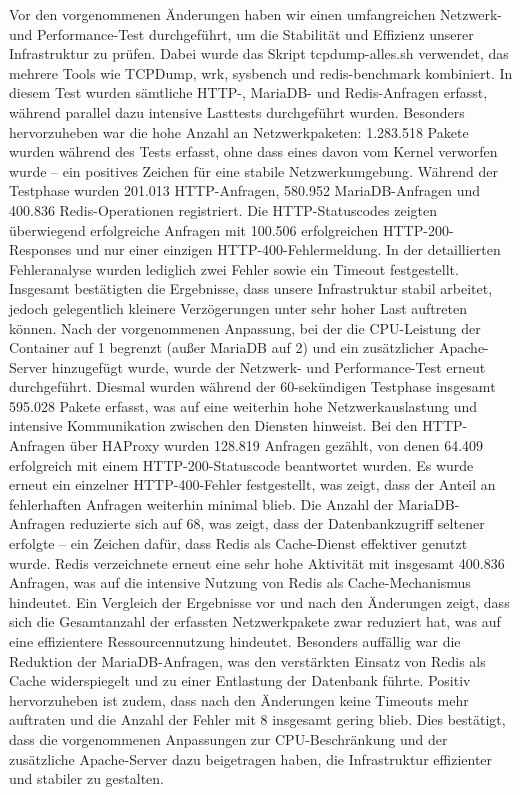 Vor den vorgenommenen Änderungen haben wir einen umfangreichen Netzwerk- und Performance-Test durchgeführt, um die Stabilität und Effizienz unserer Infrastruktur zu prüfen. Dabei wurde das Skript tcpdump-alles.sh verwendet, das mehrere Tools wie TCPDump, wrk, sysbench und redis-benchmark kombiniert. In diesem Test wurden sämtliche HTTP-, MariaDB- und Redis-Anfragen erfasst, während parallel dazu intensive Lasttests durchgeführt wurden. Besonders hervorzuheben war die hohe Anzahl an Netzwerkpaketen: 1.283.518 Pakete wurden während des Tests erfasst, ohne dass eines davon vom Kernel verworfen wurde – ein positives Zeichen für eine stabile Netzwerkumgebung. Während der Testphase wurden 201.013 HTTP-Anfragen, 580.952 MariaDB-Anfragen und 400.836 Redis-Operationen registriert. Die HTTP-Statuscodes zeigten überwiegend erfolgreiche Anfragen mit 100.506 erfolgreichen HTTP-200-Responses und nur einer einzigen HTTP-400-Fehlermeldung. In der detaillierten Fehleranalyse wurden lediglich zwei Fehler sowie ein Timeout festgestellt. Insgesamt bestätigten die Ergebnisse, dass unsere Infrastruktur stabil arbeitet, jedoch gelegentlich kleinere Verzögerungen unter sehr hoher Last auftreten können.
Nach der vorgenommenen Anpassung, bei der die CPU-Leistung der Container auf 1 begrenzt (außer MariaDB auf 2) und ein zusätzlicher Apache-Server hinzugefügt wurde, wurde der Netzwerk- und Performance-Test erneut durchgeführt. Diesmal wurden während der 60-sekündigen Testphase insgesamt 595.028 Pakete erfasst, was auf eine weiterhin hohe Netzwerkauslastung und intensive Kommunikation zwischen den Diensten hinweist. Bei den HTTP-Anfragen über HAProxy wurden 128.819 Anfragen gezählt, von denen 64.409 erfolgreich mit einem HTTP-200-Statuscode beantwortet wurden. Es wurde erneut ein einzelner HTTP-400-Fehler festgestellt, was zeigt, dass der Anteil an fehlerhaften Anfragen weiterhin minimal blieb. Die Anzahl der MariaDB-Anfragen reduzierte sich auf 68, was zeigt, dass der Datenbankzugriff seltener erfolgte – ein Zeichen dafür, dass Redis als Cache-Dienst effektiver genutzt wurde. Redis verzeichnete erneut eine sehr hohe Aktivität mit insgesamt 400.836 Anfragen, was auf die intensive Nutzung von Redis als Cache-Mechanismus hindeutet.
Ein Vergleich der Ergebnisse vor und nach den Änderungen zeigt, dass sich die Gesamtanzahl der erfassten Netzwerkpakete zwar reduziert hat, was auf eine effizientere Ressourcennutzung hindeutet. Besonders auffällig war die Reduktion der MariaDB-Anfragen, was den verstärkten Einsatz von Redis als Cache widerspiegelt und zu einer Entlastung der Datenbank führte. Positiv hervorzuheben ist zudem, dass nach den Änderungen keine Timeouts mehr auftraten und die Anzahl der Fehler mit 8 insgesamt gering blieb. Dies bestätigt, dass die vorgenommenen Anpassungen zur CPU-Beschränkung und der zusätzliche Apache-Server dazu beigetragen haben, die Infrastruktur effizienter und stabiler zu gestalten.

